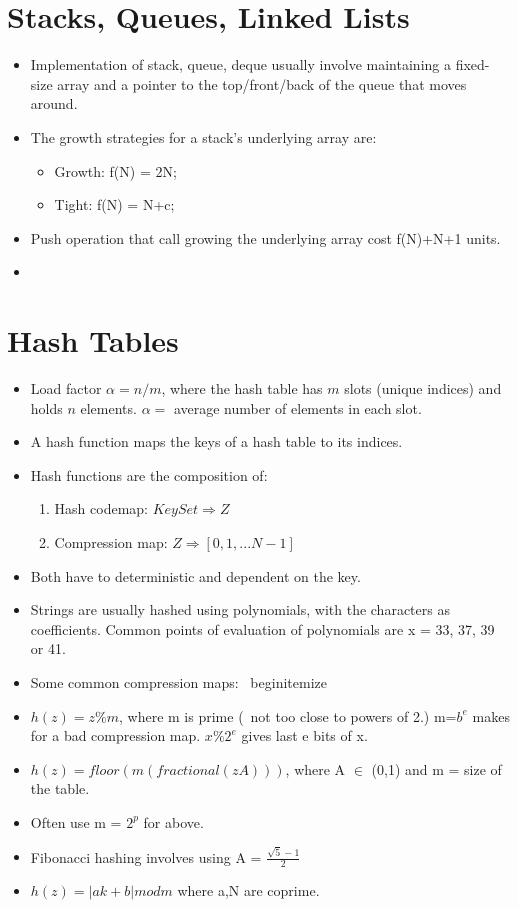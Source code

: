 \documentclass{report}
\begin{document}
\section{Stacks, Queues, Linked Lists}
\begin{itemize}
\item Implementation of stack, queue, deque usually involve maintaining a
fixed-size array and a pointer to the top/front/back of the queue that moves around.
\item The growth strategies for a stack's underlying array are:
\begin{itemize}
    \item Growth: f(N) = 2N;
    \item Tight: f(N) = N+c;
\end{itemize}
\item Push operation that call growing the underlying array cost f(N)+N+1 units.
\item 
\end{itemize}
\section{Hash Tables}
\begin{itemize}
\item Load factor $\alpha = n/m$, where the hash table has $m$ slots (unique indices)
and holds $n$ elements. $\alpha = $ average number of elements in each slot.
\item A hash function maps the keys of a hash table to its indices.
\item Hash functions are the composition of:
\begin{enumerate}
    \item Hash codemap: $KeySet \Longrightarrow Z$
    \item Compression map: $Z \Longrightarrow [0,1,...N-1]$
\end{enumerate}
\item Both have to deterministic and dependent on the key.
\item Strings are usually hashed using polynomials, with the characters
as coefficients. Common points of evaluation of polynomials are
x = 33, 37, 39 or 41.
\item Some common compression maps:
\
begin{itemize}
    \item $h(z) = z \% m$, where m is prime (~not too close to powers of 2.) m=$b^e$ makes for a bad compression map.
    $x \% 2^e$ gives last e bits of x.
    \item $h(z) = floor(m(fractional(zA)))$, where A $\in$ (0,1) and m = size of the table.
    \item Often use m = $2^p$ for above.
    \item Fibonacci hashing involves using A = $\frac{\sqrt{5}-1}{2}$
    \item $h(z) = |ak+b| mod m$ where a,N are coprime.
\end{itemize}
\end{document}
